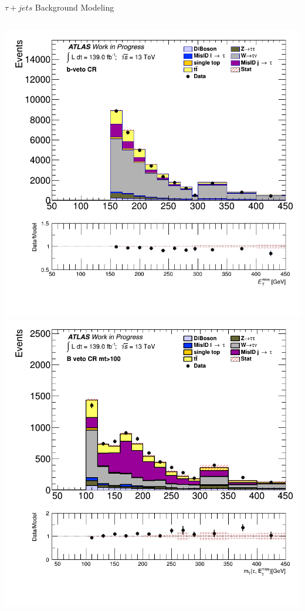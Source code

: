 \documentclass[aspectratio=169,xcolor=table]{beamer}
\begin{document}
\begin{frame}[t]{$\tau+jets$ Background Modeling}
\begin{columns}[t]
          \includegraphics[height=.45\textheight,keepaspectratio=true]{taujet_1p_3p/v09/met_et_BVETO.png}
          \includegraphics[height=.45\textheight,keepaspectratio=true]{taujet_1p_3p/v09/tau_0_met_mt_bveto100.png}

        \end{columns}
      \end{frame}
\end{document}
